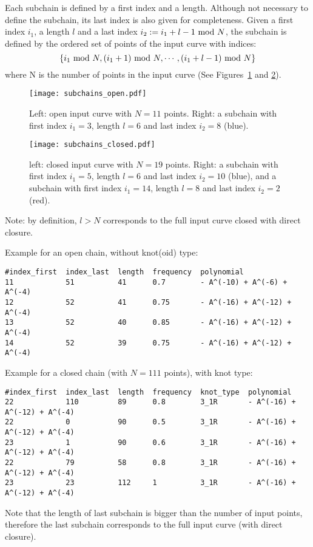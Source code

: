 Each subchain is defined by a first index  and a length. Although not necessary to define the subchain, its last index is also given for completeness. Given a first index $i_1$, a length $l$ and a last index $i_2:=i_1+l-1{\rm\ mod\ } N$, the subchain is defined by the ordered set of points of the input curve with indices:
\[\{i_1{\rm\ mod\ } N,(i_1+1){\rm\ mod\ } N,\cdots,(i_1+l-1){\rm\ mod\ } N\}\]
where N is the number of points in the input curve (See Figures~\ref{fig:subchains:open} and \ref{fig:subchains:closed}).  
\begin{figure}[t]
\centering
\texttt{[image: subchains\_open.pdf]}
\caption{Left: open input curve with $N=11$ points. Right: a subchain with first index $i_1=3$, length $l=6$ and last index $i_2=8$ (blue).}\label{fig:subchains:open}
\end{figure}
\begin{figure}[t]
\centering
\texttt{[image: subchains\_closed.pdf]}
\caption{left: closed input curve with $N=19$ points. Right: a subchain with first index $i_1=5$, length $l=6$ and last index $i_2=10$ (blue), and a  subchain with first index $i_1=14$, length $l=8$ and last index $i_2=2$ (red).}\label{fig:subchains:closed}
\end{figure}

Note: by definition, $l>N$ corresponds to the full input curve closed with direct closure.


Example for an open chain, without knot(oid) type:
\begin{lstlisting}
#index_first  index_last  length  frequency  polynomial
11            51          41      0.7        - A^(-10) + A^(-6) + A^(-4)
12            52          41      0.75       - A^(-16) + A^(-12) + A^(-4)
13            52          40      0.85       - A^(-16) + A^(-12) + A^(-4)
14            52          39      0.75       - A^(-16) + A^(-12) + A^(-4)
\end{lstlisting}

Example for a closed chain (with $N=111$ points), with knot type:
\begin{lstlisting}
#index_first  index_last  length  frequency  knot_type  polynomial
22            110         89      0.8        3_1R       - A^(-16) + A^(-12) + A^(-4)
22            0           90      0.5        3_1R       - A^(-16) + A^(-12) + A^(-4)
23            1           90      0.6        3_1R       - A^(-16) + A^(-12) + A^(-4)
22            79          58      0.8        3_1R       - A^(-16) + A^(-12) + A^(-4)
23            23          112     1          3_1R       - A^(-16) + A^(-12) + A^(-4)
\end{lstlisting}
Note that the length of last subchain is bigger than the number of input points, therefore the last subchain corresponds to the full input curve (with direct closure).

